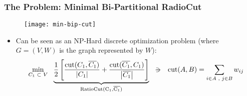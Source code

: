 \begin{frame}
  \frametitle{The Problem: Minimal Bi-Partitional RadioCut}
  \begin{figure}
    \centering
    \texttt{[image: min-bip-cut]}
  \end{figure}
  \begin{itemize}
  \item Can be seen as an NP-Hard discrete optimization problem (where $G = (V,W)$ is the graph represented by $W$):
    \begin{equation*}
      \min\limits_{\tiny{C_1 \ds{\subset} V}} \ds{}
      \underbrace{      
        \frac{1}{2}
        \left[
          \dfrac{\func{cut}(C_1,\stcomp{C_1})}{\abs{C_1}} +
          \dfrac{\func{cut}(\stcomp{C_1},C_1)}{\abs{\stcomp{C_1}}}
          \right]
        }_{\func{RatioCut(C_1,\stcomp{C_1})}}
      \ds{\suchthat}
      \func{cut}(A,B) = \sum\limits_{\tiny{i \in A \ds{,} j \in B}} w_{ij}
    \end{equation*}
  \end{itemize}
\end{frame}
